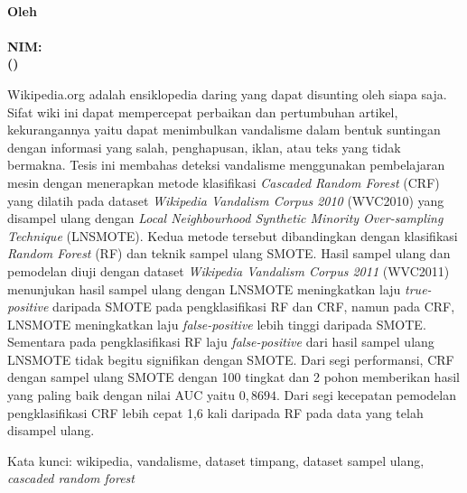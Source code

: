 \begin{center}
\textbf{\large
	\MakeUppercase{\mytitle{}} \\
	\bigskip
	\textnormal{Oleh} \\
	\myname{} \\
	NIM: \mysid{} \\
	(\mydept{}) \\
}
\end{center}

\bigskip
\bigskip
\bigskip

Wikipedia.org adalah ensiklopedia daring yang dapat disunting oleh siapa saja.
Sifat wiki ini dapat mempercepat perbaikan dan pertumbuhan artikel,
kekurangannya yaitu dapat menimbulkan vandalisme dalam bentuk suntingan dengan
informasi yang salah, penghapusan, iklan, atau teks yang tidak bermakna.
Tesis ini membahas deteksi vandalisme menggunakan pembelajaran mesin
dengan menerapkan metode klasifikasi
\textit{Cascaded Random Forest} (CRF)
yang dilatih pada dataset
\textit{Wikipedia Vandalism Corpus 2010} (WVC2010)
yang
disampel ulang dengan
\textit{Local Neighbourhood Synthetic Minority Over-sampling Technique}
(LNSMOTE).
Kedua metode tersebut dibandingkan dengan klasifikasi
\textit{Random Forest} (RF)
dan teknik sampel ulang SMOTE.
Hasil sampel ulang dan pemodelan diuji dengan dataset
\textit{Wikipedia Vandalism Corpus 2011} (WVC2011)
menunjukan hasil sampel ulang dengan LNSMOTE meningkatkan laju
\textit{true-positive} daripada SMOTE pada pengklasifikasi RF dan CRF, namun
pada CRF, LNSMOTE meningkatkan laju \textit{false-positive} lebih tinggi
daripada SMOTE.
Sementara pada pengklasifikasi RF laju \textit{false-positive} dari hasil
sampel ulang LNSMOTE tidak begitu signifikan dengan SMOTE.
Dari segi performansi, CRF dengan sampel ulang SMOTE dengan 100 tingkat dan 2
pohon memberikan hasil yang paling baik dengan nilai AUC yaitu $0,8694$.
Dari segi kecepatan pemodelan pengklasifikasi CRF lebih cepat 1,6 kali daripada
RF pada data yang telah disampel ulang.


Kata kunci: wikipedia, vandalisme, dataset timpang, dataset sampel ulang,
\textit{cascaded random forest}
